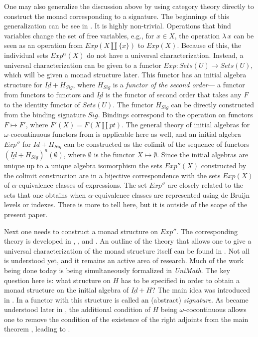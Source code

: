 \documentclass[onecolumn,12pt]{amsart}
\numberwithin{proposition}{subsection}
\newcommand{\sr}{\rightarrow}
\newcommand{\uu}{\underline}
\begin{document}
One may also generalize the discussion above by using category theory directly
to construct the monad corresponding to a signature.  The beginnings
of this generalization can be see in \cite{FPT}. It is highly non-trivial.
Operations that bind variables change the set of free variables, e.g., for $x\in
X$, the operation $\lambda\,x$ can be seen as an operation from
$Exp(X\coprod\{x\})$ to $Exp(X)$. Because of this, the individual sets
$Exp^{\alpha}(X)$ do not have a universal characterization.  Instead, a universal
characterization can be given to a functor $Exp:Sets(U)\sr Sets(U)$, which will
be given a monad structure later.  This functor has an initial algebra structure
for $\uu{Id}+H_{Sig}$, where $H_{Sig}$ is a {\em functor of the second order}---%
a functor from functors to functors and $\uu{Id}$ is the functor of second
order that takes any $F$ to the identity functor of $Sets(U)$. The functor
$H_{Sig}$ can be directly constructed from the binding signature
$Sig$. Bindings correspond to the operation on functors $F\mapsto F'$, where
$F'(X)=F(X\coprod pt)$. The general theory of initial algebras for
$\omega$-cocontinuous functors from \cite{Adamek1974} is applicable here as
well, and an initial algebra $Exp''$ for $\uu{Id}+H_{Sig}$ can be constructed as
the colimit of the sequence of functors $(\uu{Id}+H_{Sig})^n(\uu{\emptyset})$,
where $\uu{\emptyset}$ is the functor $X\mapsto \emptyset$. Since the initial
algebras are unique up to a unique algebra isomorphism the sets $Exp''(X)$
constructed by the colimit construction are in a bijective correspondence with
the sets $Exp(X)$ of $\alpha$-equivalence classes of expressions. The set
$Exp''$ are closely related to the sets that one obtains when 
$\alpha$-equivalence classes are represented using de Bruijn levels or indexes. 
There is more
to tell here, but it is outside of the scope of the present
paper.

Next one needs to construct a monad structure on $Exp''$. The corresponding
theory is developed in \cite{MatthesUustalu}, \cite{AM2016}, and
\cite{AMM2016}. An outline of the theory that allows one to give a universal
characterization of the monad structure itself can be found in
\cite{HM2012}. Not all is understood yet, and it remains an active area of
research. Much of the work being done today is being simultaneously
formalized in {\em UniMath}. The key question here is: what structure on $H$ has
to be specified in order to obtain a monad structure on the initial algebra of
$\uu{Id}+H$?  The main idea was introduced in \cite{MatthesUustalu}. In
\cite{AM2016} a functor with this structure is called an (abstract)
{\em signature}. As became understood later in \cite{AMM2016}, the additional
condition of $H$ being $\omega$-cocontinuous allows one to remove the condition
of the existence of the right adjoints from the main theorem \cite[Th. 15,
  p.~170]{MatthesUustalu}, leading to \cite[Th. 48]{AMM2016}.
\end{document}
